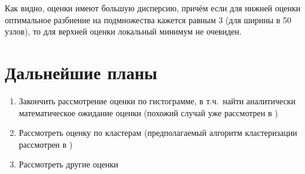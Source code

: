 \documentclass[specialist,
               substylefile = spbu.rtx,
               subf,href,colorlinks=true, 12pt]{disser}
\begin{document}
\conclusion
	Как видно, оценки имеют большую дисперсию, причём если для нижней оценки оптимальное разбиение на подмножества кажется равным 3 (для ширины в 50 узлов), то для верхней оценки локальный минимум не очевиден.

\section*{Дальнейшие планы}
	\begin{enumerate}
		\item Закончить рассмотрение оценки по гистограмме, в т.ч.\ найти аналитически математическое ожидание оценки (похожий случай уже рассмотрен в \citep{montekarlo1975})
		\item Рассмотреть оценку по кластерам (предполагаемый алгоритм кластеризации рассмотрен в \citep{Arthur2007})
		\item Рассмотреть другие оценки
	\end{enumerate}
\nocite{*}



\appendix
\end{document}

